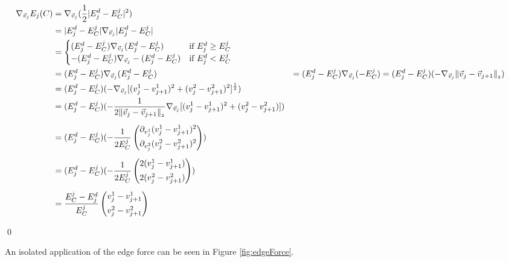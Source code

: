 \begin{proposition}
	\begin{align*}
		\nabla_{\vec{v}_{j}} E_{j}(C) &= \nabla_{\vec{v}_j} (\frac{1}{2} |E_j^d - E^j_C|^2) \\
		&= |E_j^d - E^j_C| \nabla_{\vec{v}_j} |E_j^d - E^j_C| \\
		&= \begin{cases}
			(E_j^d - E^j_C) \nabla_{\vec{v}_j} (E_j^d - E^j_C) &\text{if } E_j^d \geq E^j_C \\
			- (E_j^d - E^j_C) \nabla_{\vec{v}_j} - (E_j^d - E^j_C) &\text{if } E_j^d < E^j_C
		\end{cases}\\
		&= (E_j^d - E^j_C) \nabla_{\vec{v}_j} (E_j^d - E^j_C)
		&= (E_j^d - E^j_C) \nabla_{\vec{v}_j} ( - E^j_C)
		&= (E_j^d - E^j_C) (- \nabla_{\vec{v}_j} \norm[\vec{v}_j - \vec{v}_{j+1}] ) \\
		&= (E_j^d - E^j_C) (- \nabla_{\vec{v}_j} [(v_j^1 - v_{j+1}^1)^2 + (v_j^2 - v_{j+1}^2)^2]^{\frac{1}{2}} ) \\
		&= (E_j^d - E^j_C) (- \frac{1}{2 \norm[\vec{v}_j - \vec{v}_{j+1}]} \nabla_{\vec{v}_j} [(v_j^1 - v_{j+1}^1)^2 + (v_j^2 - v_{j+1}^2)]) \\[0.5em] 
		&= (E_j^d - E^j_C) (- \frac{1}{2 E^j_C} \begin{pmatrix}
			\partial_{v_j^1} (v_j^1 - v_{j+1}^1)^2 \\[0.5em]
			\partial_{v_j^2} (v_j^2 - v_{j+1}^2)^2
		\end{pmatrix}) \\[0.5em]
		&= (E_j^d - E^j_C) (- \frac{1}{2 E^j_C} \begin{pmatrix}
			 2(v_j^1 - v_{j+1}^1) \\[0.5em]
			 2(v_j^2 - v_{j+1}^2)
		\end{pmatrix}) \\[0.5em] 
		&= \frac{E^j_C - E_j^d}{E^j_C} \begin{pmatrix}
			v_j^1 - v_{j+1}^1 \\[0.5em]
			v_j^2 - v_{j+1}^2
	   \end{pmatrix} 
	\end{align*}

	\qed  
\end{proposition}

An isolated application of the edge force can be seen in Figure \ref{fig:edgeForce}.  

